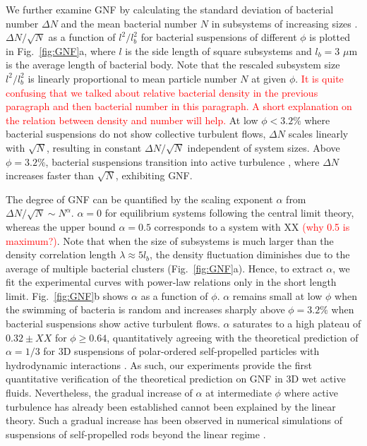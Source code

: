 \documentclass[twocolumn,aps,prl,amsmath,amssymb,longbibliography]{revtex4-2}
\begin{document}
We further examine GNF by calculating the standard deviation of bacterial number $\Delta N$ and the mean bacterial number $N$ in subsystems of increasing sizes \cite{Liu2020}. $\Delta N / \sqrt N$ as a function of $l^2/l_b^2$ for bacterial suspensions of different $\phi$ is plotted in Fig.~\ref{fig:GNF}a, where $l$ is the side length of square subsystems and $l_b=3$ $\mu$m is the average length of bacterial body. Note that the rescaled subsystem size $l^2/l_b^2$ is linearly proportional to mean particle number $N$ at given $\phi$. \textcolor{red}{It is quite confusing that we talked about relative bacterial density in the previous paragraph and then bacterial number in this paragraph. A short explanation on the relation between density and number will help.} At low $\phi<3.2\%$ where bacterial suspensions do not show collective turbulent flows, $\Delta N$ scales linearly with $\sqrt N$, resulting in constant $\Delta N / \sqrt N$ independent of system sizes. Above $\phi=3.2\%$, bacterial suspensions transition into active turbulence \cite{Peng2020}, where $\Delta N$ increases faster than $\sqrt N$, exhibiting GNF.

The degree of GNF can be quantified by the scaling exponent $\alpha$ from $\Delta N/\sqrt{N} \sim N^\alpha$. $\alpha=0$ for equilibrium systems following the central limit theory, whereas the upper bound $\alpha = 0.5$ corresponds to a system with XX \textcolor{red}{(why 0.5 is maximum?)}.
Note that when the size of subsystems is much larger than the density correlation length $\lambda \approx 5l_b$, the density fluctuation diminishes due to the average of multiple bacterial clusters (Fig.~\ref{fig:GNF}a). Hence, to extract $\alpha$, we fit the experimental curves with power-law relations only in the short length limit. Fig.~\ref{fig:GNF}b shows $\alpha$ as a function of $\phi$. $\alpha$ remains small at low $\phi$ when the swimming of bacteria is random and increases sharply above $\phi = 3.2\%$ when bacterial suspensions show active turbulent flows.
$\alpha$ saturates to a high plateau of $0.32 \pm XX$ for $\phi \geq 0.64$, quantitatively agreeing with the theoretical prediction of $\alpha = 1/3$ for 3D suspensions of polar-ordered self-propelled particles with hydrodynamic interactions \cite{AditiSimha2002}. As such, our experiments provide the first quantitative verification of the theoretical prediction on GNF in 3D wet active fluids. Nevertheless, the gradual increase of $\alpha$ at intermediate $\phi$ where active turbulence has already been established cannot been explained by the linear theory. Such a gradual increase has been observed in numerical simulations of suspensions of self-propelled rods beyond the linear regime \cite{Saintillan2012}.
\end{document}
